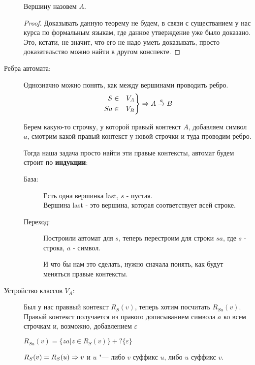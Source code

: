 \begin{description}
    Вершину назовем $A$.

    \begin{proof}
    Доказывать данную теорему не будем, 
    в связи с существанием у нас курса по формальным языкам, где 
    данное утверждение уже было доказано. Это, кстати, не значит, что его
    не надо уметь доказывать, просто доказательство можно найти в другом конспекте. 
    \end{proof}

    \item[Ребра автомата:]
    Однозначно можно понять, как между вершинами проводить ребро. 
    $$\left.
    \begin{aligned}
    S &\in& V_A\\
    Sa &\in& V_B
    \end{aligned}
    \right\} \Rightarrow A \overset{a}{\rightarrow} B$$
    
    Берем какую-то строчку, у которой правый контекст $A$, добавляем символ $a$, 
    смотрим какой правый контекст у новой строчки и туда проводим ребро.

    Тогда наша задача просто найти эти правые контексты, автомат будем строит по \textbf{индукции}:
    \begin{description}
    \item[База:]
     Есть одна вершинка last, $s$ - пустая.\\
     Вершина last - это вершина, которая соответствует всей строке. 
    \item[Переход:]
     Построили автомат для $s$, теперь перестроим для строки $sa$, где $s$ - строка, $a$ - символ.
    
     И что бы нам это сделать, нужно сначала понять, как будут меняться правые контексты. 
    \end{description}
    \item[Устройство классов $V_A$:]
    \begin{lemma}
    Был у нас праввый контекст $R_S(v)$, теперь хотим посчитать $R_{Sa}(v)$. 
    Правый контекст получается из правого дописыванием символа $a$ ко всем строчкам и, 
    возможно, добавлением $\varepsilon$

    $R_{Sa}(v) = \{za|z \in R_S(v)\} +? \{\varepsilon\}$
    \end{lemma}
    
    \begin{lemma}
    $R_S(v) = R_S(u) \Rightarrow v$ и $u$  "---  либо $v$ суффикс $u$, либо $u$ суффикс $v$. 
    \end{lemma}


\end{description}
